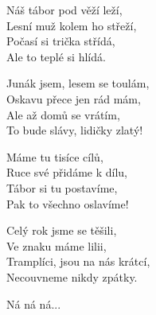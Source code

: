 
\ve
{}Náš tábor pod věží leží,\\
Lesní muž kolem ho střeží,\\
Počasí si trička střídá,\\
Ale to teplé si hlídá.

\cho{}
Junák jsem, lesem se toulám,\\
Oskavu přece jen rád mám,\\
Ale až domů se vrátím,\\
To bude slávy, lidičky zlatý!

\ve
Máme tu tisíce cílů,\\
Ruce své přidáme k dílu,\\
Tábor si tu postavíme,\\
Pak to všechno oslavíme!

\cho{}

\ve
Celý rok jsme se těšili,\\
Ve znaku máme lilii,\\
Tramplíci, jsou na nás krátcí,\\
Necouvneme nikdy zpátky.

\cho{}

\cho{}
Ná ná ná...

\esong{}